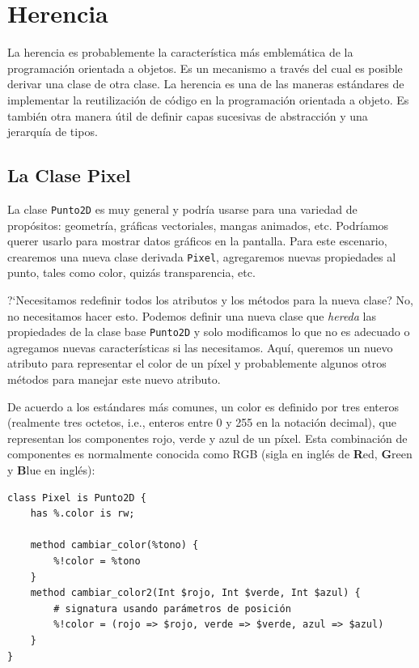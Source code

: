 \section{Herencia}

La herencia es probablemente la característica más 
emblemática de la programación orientada a objetos.
Es un mecanismo a través del cual es posible derivar una
clase de otra clase. La herencia es una de las maneras 
estándares de implementar la reutilización de código en la
programación orientada a objeto. Es también otra manera útil 
de definir capas sucesivas de abstracción y una 
jerarquía de tipos.

\subsection{La Clase Pixel}

La clase {\tt Punto2D} es muy general y podría usarse para
una variedad de propósitos: geometría, gráficas vectoriales, 
mangas animados, etc. Podríamos querer usarlo para mostrar 
datos gráficos en la pantalla. Para este escenario, crearemos
una nueva clase derivada {\tt Pixel}, agregaremos nuevas 
propiedades al punto, tales como color, quizás transparencia, etc.

?`Necesitamos redefinir todos los atributos y los métodos para la 
nueva clase? No, no necesitamos hacer esto. Podemos definir una 
nueva clase que \emph{hereda} las propiedades de la clase base 
{\tt Punto2D} y solo modificamos lo que no es adecuado o agregamos nuevas
características si las necesitamos. Aquí, queremos un nuevo
atributo para representar el color de un píxel y probablemente
algunos otros métodos para manejar este nuevo atributo.

De acuerdo a los estándares más comunes, un color es definido
por tres enteros (realmente tres octetos, i.e., enteros entre 
0 y 255 en la notación decimal), que representan los componentes
rojo, verde y azul de un píxel. Esta combinación de componentes es normalmente
conocida como RGB (sigla en inglés de {\bf R}ed, {\bf G}reen y {\bf B}lue en inglés):

\begin{lstlisting}
class Pixel is Punto2D {
    has %.color is rw;

    method cambiar_color(%tono) {
        %!color = %tono
    }
    method cambiar_color2(Int $rojo, Int $verde, Int $azul) {
        # signatura usando parámetros de posición
        %!color = (rojo => $rojo, verde => $verde, azul => $azul)
    }
}
\end{lstlisting}

